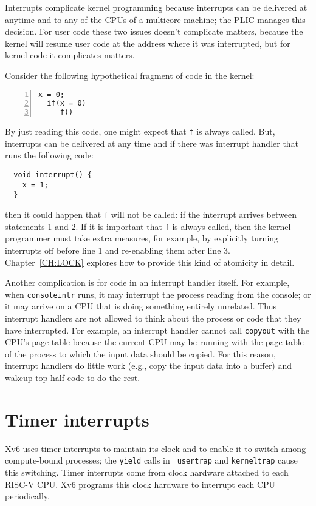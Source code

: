 Interrupts complicate kernel programming because interrupts can be
delivered at anytime and to any of the CPUs of a multicore machine;
the PLIC manages this decision. For user code these two issues doesn't
complicate matters, because the kernel will resume user code at the
address where it was interrupted, but for kernel code it complicates
matters.

Consider the following hypothetical fragment of code in the kernel:
\begin{lstlisting}[numbers=left,firstnumber=1]
  x = 0;
  if(x = 0)
     f()
\end{lstlisting}
By just reading this code, one might expect that {\tt f} is always
called. But, interrupts can be delivered at any time and if there was
interrupt handler that runs the following code:
\begin{lstlisting}
  void interrupt() {
    x = 1;
  }
\end{lstlisting}
then it could happen that {\tt f} will not be called: if the interrupt
arrives between statements 1 and 2.  If it is important that {\tt f}
is always called, then the kernel programmer must take extra measures,
for example, by explicitly turning interrupts off before line 1 and
re-enabling them after line 3.  Chapter~\ref{CH:LOCK} explores how to
provide this kind of atomicity in detail.

Another complication is for code in an interrupt handler itself.  For
example, when {\tt consoleintr} runs, it may interrupt the process
reading from the console; or it may arrive on a CPU that is doing
something entirely unrelated. Thus interrupt handlers are not allowed
to think about the process or code that they have interrupted.  For
example, an interrupt handler cannot call {\tt copyout} with the CPU's
page table because the current CPU may be running with the page table
of the process to which the input data should be copied.  For this
reason, interrupt handlers do little work (e.g., copy the input data
into a buffer) and wakeup top-half code to do the rest.

\section{Timer interrupts}

Xv6 uses timer interrupts to maintain its clock and to enable it to
switch among compute-bound processes; the {\tt yield} calls in {\tt
  usertrap} and {\tt kerneltrap} cause this switching. Timer
interrupts come from clock hardware attached to each RISC-V CPU. Xv6
programs this clock hardware to interrupt each CPU periodically.

